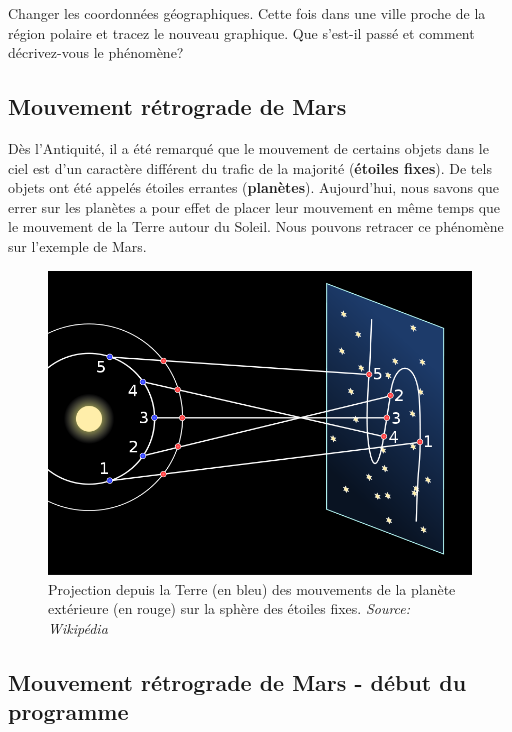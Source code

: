 \documentclass[%
oneside,                 %
final,                   %
10pt]{article}
\newenvironment{doconceexercise}{}{}
\newcounter{doconceexercisecounter}
\begin{document}
\vspace{6mm}





\begin{doconceexercise}



Changer les coordonnées géographiques. Cette fois dans une ville proche de la région polaire et tracez le nouveau graphique. Que s'est-il passé et comment décrivez-vous le phénomène?

\end{doconceexercise}


\subsection{Mouvement rétrograde de Mars}
Dès l'Antiquité, il a été remarqué que le mouvement de certains objets dans le ciel est d'un caractère différent du trafic de la majorité (\textbf{étoiles fixes}). De tels objets ont été appelés étoiles errantes (\textbf{planètes}). Aujourd'hui, nous savons que errer sur les planètes a pour effet de placer leur mouvement en même temps que le mouvement de la Terre autour du Soleil. Nous pouvons retracer ce phénomène sur l'exemple de Mars.

\begin{figure}[!ht]  %
  \centerline{\includegraphics[width=0.5\linewidth]{figs/retro_mars.png}}
  \caption{
  Projection depuis la Terre (en bleu) des mouvements de la planète extérieure (en rouge) sur la sphère des étoiles fixes. \emph{Source: Wikipédia}
  }
\end{figure}


\subsection{Mouvement rétrograde de Mars - début du programme}
\end{document}
